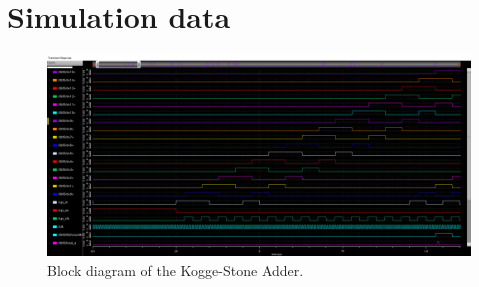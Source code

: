 \section{Simulation data} \label{app:sim_data}

\begin{figure}[H]
	\centering
	\captionsetup{justification=centering}
	\includegraphics[scale=0.5, angle=90]{../figures/test_spi_receive.png}
	\caption{Block diagram of the Kogge-Stone Adder.} \label{fig:ks_block}
\end{figure}